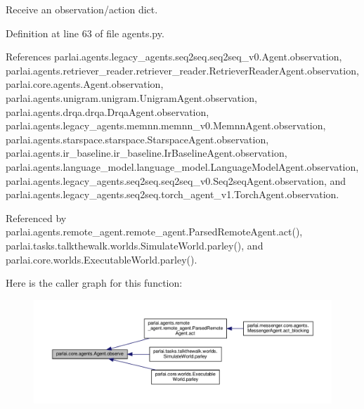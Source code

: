\begin{DoxyVerb}Receive an observation/action dict.\end{DoxyVerb}
 

Definition at line 63 of file agents.\+py.



References parlai.\+agents.\+legacy\+\_\+agents.\+seq2seq.\+seq2seq\+\_\+v0.\+Agent.\+observation, parlai.\+agents.\+retriever\+\_\+reader.\+retriever\+\_\+reader.\+Retriever\+Reader\+Agent.\+observation, parlai.\+core.\+agents.\+Agent.\+observation, parlai.\+agents.\+unigram.\+unigram.\+Unigram\+Agent.\+observation, parlai.\+agents.\+drqa.\+drqa.\+Drqa\+Agent.\+observation, parlai.\+agents.\+legacy\+\_\+agents.\+memnn.\+memnn\+\_\+v0.\+Memnn\+Agent.\+observation, parlai.\+agents.\+starspace.\+starspace.\+Starspace\+Agent.\+observation, parlai.\+agents.\+ir\+\_\+baseline.\+ir\+\_\+baseline.\+Ir\+Baseline\+Agent.\+observation, parlai.\+agents.\+language\+\_\+model.\+language\+\_\+model.\+Language\+Model\+Agent.\+observation, parlai.\+agents.\+legacy\+\_\+agents.\+seq2seq.\+seq2seq\+\_\+v0.\+Seq2seq\+Agent.\+observation, and parlai.\+agents.\+legacy\+\_\+agents.\+seq2seq.\+torch\+\_\+agent\+\_\+v1.\+Torch\+Agent.\+observation.



Referenced by parlai.\+agents.\+remote\+\_\+agent.\+remote\+\_\+agent.\+Parsed\+Remote\+Agent.\+act(), parlai.\+tasks.\+talkthewalk.\+worlds.\+Simulate\+World.\+parley(), and parlai.\+core.\+worlds.\+Executable\+World.\+parley().

Here is the caller graph for this function\+:
\nopagebreak
\begin{figure}[H]
\begin{center}
\leavevmode
\includegraphics[width=350pt]{classparlai_1_1core_1_1agents_1_1Agent_a98041e2d186aa81bd5e1649a91f623bc_icgraph}
\end{center}
\end{figure}
\mbox{\label{classparlai_1_1core_1_1agents_1_1Agent_a27cb8206372681605b00dc28b81a7c39}} 
